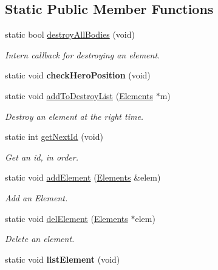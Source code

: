 \subsection*{Static Public Member Functions}
\begin{DoxyCompactItemize}
\item 
static bool \hyperlink{class_game_aea5feef3f31df1099cbabf1ffc1d1a49}{destroy\+All\+Bodies} (void)
\begin{DoxyCompactList}\small\item\em Intern callback for destroying an element. \end{DoxyCompactList}\item 
\hypertarget{class_game_a7fa4339baaa09b77d64c42de5d419abf}{static void {\bfseries check\+Hero\+Position} (void)}\label{class_game_a7fa4339baaa09b77d64c42de5d419abf}

\item 
static void \hyperlink{class_game_ae3c5dc329506d37d244ef3587ac813af}{add\+To\+Destroy\+List} (\hyperlink{class_elements}{Elements} $\ast$m)
\begin{DoxyCompactList}\small\item\em Destroy an element at the right time. \end{DoxyCompactList}\item 
static int \hyperlink{class_game_aec4cafc10218eb665d67bf027ddbd3f1}{get\+Next\+Id} (void)
\begin{DoxyCompactList}\small\item\em Get an id, in order. \end{DoxyCompactList}\item 
static void \hyperlink{class_game_a10d84bf0157d5b3abf102846d5170af5}{add\+Element} (\hyperlink{class_elements}{Elements} \&elem)
\begin{DoxyCompactList}\small\item\em Add an Element. \end{DoxyCompactList}\item 
static void \hyperlink{class_game_a644e15f76310ed410817e8423ad7a5b2}{del\+Element} (\hyperlink{class_elements}{Elements} $\ast$elem)
\begin{DoxyCompactList}\small\item\em Delete an element. \end{DoxyCompactList}\item 
\hypertarget{class_game_aafc84f0b25d07825f08dffc07af73918}{static void {\bfseries list\+Element} (void)}\label{class_game_aafc84f0b25d07825f08dffc07af73918}


\end{DoxyCompactItemize}
